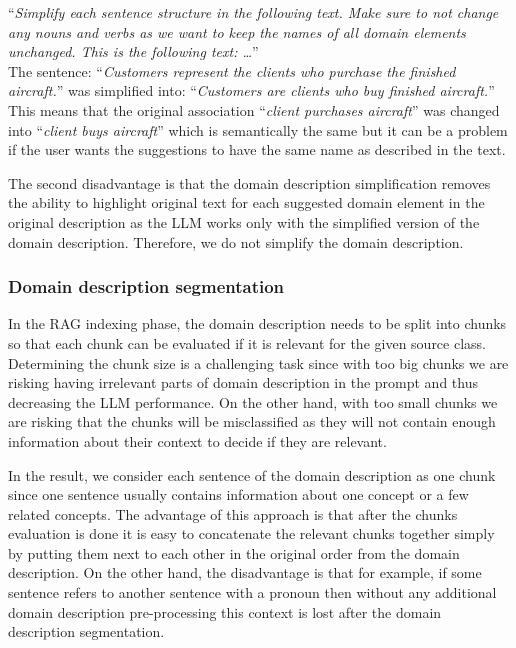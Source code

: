 \noindent{}``\textit{Simplify each sentence structure in the following text. Make sure to not change any nouns and verbs as we want to keep the names of all domain elements unchanged. This is the following text: \ldots}'' \\

\noindent{}The sentence: ``\textit{Customers represent the clients who purchase the finished aircraft.}'' was simplified into: ``\textit{Customers are clients who buy finished aircraft.}'' This means that the original association ``\textit{client purchases aircraft}'' was changed into ``\textit{client buys aircraft}'' which is semantically the same but it can be a problem if the user wants the suggestions to have the same name as described in the text.

The second disadvantage is that the domain description simplification removes the ability to highlight original text for each suggested domain element in the original description as the LLM works only with the simplified version of the domain description. Therefore, we do not simplify the domain description.


\subsubsection{Domain description segmentation}

In the RAG indexing phase, the domain description needs to be split into chunks so that each chunk can be evaluated if it is relevant for the given source class. Determining the chunk size is a challenging task since with too big chunks we are risking having irrelevant parts of domain description in the prompt and thus decreasing the LLM performance. On the other hand, with too small chunks we are risking that the chunks will be misclassified as they will not contain enough information about their context to decide if they are relevant.

In the result, we consider each sentence of the domain description as one chunk since one sentence usually contains information about one concept or a few related concepts. The advantage of this approach is that after the chunks evaluation is done it is easy to concatenate the relevant chunks together simply by putting them next to each other in the original order from the domain description. On the other hand, the disadvantage is that for example, if some sentence refers to another sentence with a pronoun then without any additional domain description pre-processing this context is lost after the domain description segmentation.


